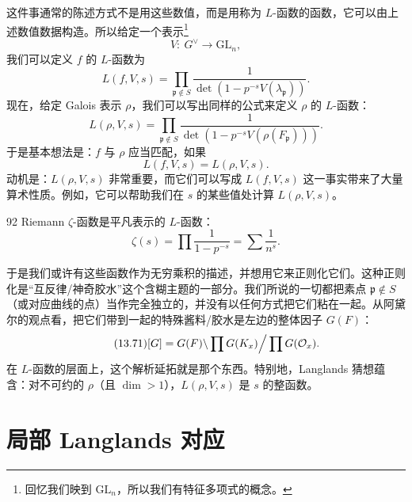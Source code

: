 这件事通常的陈述方式不是用这些数值，而是用称为 $L$-函数的函数，它可以由上述数值数据构造。所以给定一个表示\footnote{回忆我们映到 $\mathrm{GL}_n$，所以我们有特征多项式的概念。}
\begin{equation}\tag{13.66}
V:\ G^\vee\to\mathrm{GL}_n,
\end{equation}
我们可以定义 $f$ 的 $L$-函数为
\begin{equation}\tag{13.67}
L(f,V,s)=\prod_{\mathfrak p\notin S}\frac{1}{\det(1-p^{-s}V(\lambda_{\mathfrak p}))}.
\end{equation}
现在，给定 Galois 表示 $\rho$，我们可以写出同样的公式来定义 $\rho$ 的 $L$-函数：
\begin{equation}\tag{13.68}
L(\rho,V,s)=\prod_{\mathfrak p\notin S}\frac{1}{\det(1-p^{-s}V(\rho(F_{\mathfrak p})))}.
\end{equation}
于是基本想法是：$f$ 与 $\rho$ 应当匹配，如果
\begin{equation}\tag{13.69}
L(f,V,s)=L(\rho,V,s).
\end{equation}
动机是：$L(\rho,V,s)$ 非常重要，而它们可以写成 $L(f,V,s)$ 这一事实带来了大量算术性质。例如，它可以帮助我们在 $s$ 的某些值处计算 $L(\rho,V,s)$。

\begin{srcex}{92}
Riemann $\zeta$-函数是平凡表示的 $L$-函数：
\begin{equation}\tag{13.70}
\zeta(s)=\prod\frac{1}{1-p^{-s}}=\sum\frac{1}{n^s}.
\end{equation}
\end{srcex}

于是我们或许有这些函数作为无穷乘积的描述，并想用它来正则化它们。这种正则化是“互反律/神奇胶水”这个含糊主题的一部分。我们所说的一切都把素点 $\mathfrak p\notin S$（或对应曲线的点）当作完全独立的，并没有以任何方式把它们粘在一起。从阿黛尔的观点看，把它们带到一起的特殊酱料/胶水是左边的整体因子 $G(F)$：
\begin{equation}\tag{13.71}
[G]=G(F)\backslash\prod G(K_x)\Big/\prod G(\mathcal{O}_x).
\end{equation}
在 $L$-函数的层面上，这个解析延拓就是那个东西。特别地，Langlands 猜想蕴含：对不可约的 $\rho$（且 $\dim>1$），$L(\rho,V,s)$ 是 $s$ 的整函数。

\section{局部 Langlands 对应}\label{sec:13-6}

